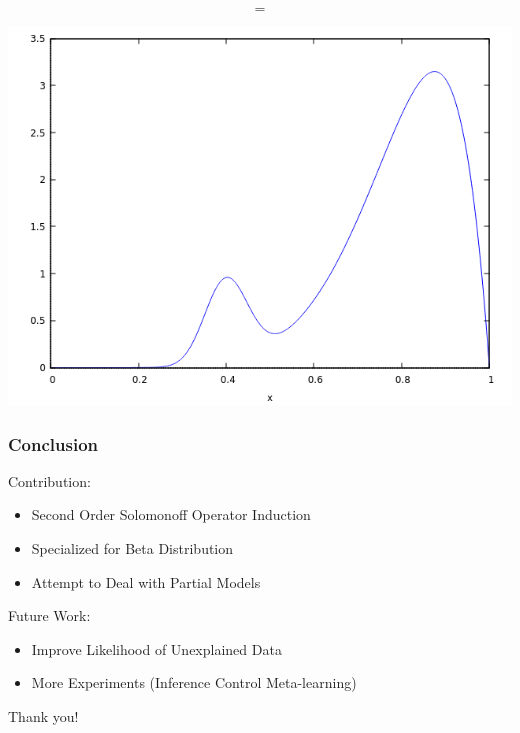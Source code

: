 \documentclass{beamer}
\begin{document}
\begin{frame}[fragile]
\begin{columns}
\end{columns}

$$=$$

\begin{center}\includegraphics[scale=0.2]{images/Beta_mixed_c_0_01_alpha.png}\end{center}

\end{frame}



\begin{frame}
  \frametitle{Conclusion}

  Contribution:
  \begin{itemize}
  \item Second Order Solomonoff Operator Induction
  \item Specialized for Beta Distribution
  \item Attempt to Deal with Partial Models
  \end{itemize}

  \pause
  
  Future Work:
  \begin{itemize}
  \item Improve Likelihood of Unexplained Data
  \item More Experiments (Inference Control Meta-learning)
  \end{itemize}

  \pause

  \begin{center}
    Thank you!
  \end{center}

\end{frame}
\end{document}
